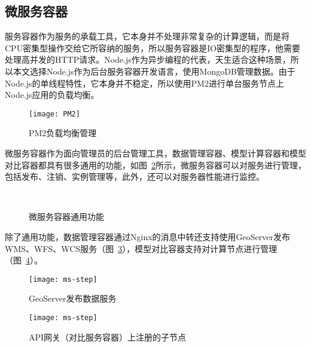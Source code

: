 \subsection{微服务容器}
服务容器作为服务的承载工具，它本身并不处理非常复杂的计算逻辑，而是将CPU密集型操作交给它所容纳的服务，所以服务容器是IO密集型的程序，他需要处理高并发的HTTP请求。Node.js作为异步编程的代表，天生适合这种场景，所以本文选择Node.js作为后台服务容器开发语言，使用MongoDB管理数据。由于Node.js的单线程特性，它本身并不稳定，所以使用PM2进行单台服务节点上Node.js应用的负载均衡。

\begin{figure}[!htbp]
    \centering
    \texttt{[image: PM2]}
    \caption{PM2负载均衡管理}
    \label{fig:ms-step}
\end{figure}

微服务容器作为面向管理员的后台管理工具，数据管理容器、模型计算容器和模型对比容器都具有很多通用的功能，如图~\ref{fig:service-container-common-fn}所示，微服务容器可以对服务进行管理，包括发布、注销、实例管理等，此外，还可以对服务器性能进行监控。

\begin{figure}[!htbp]
    \centering
    \hfill
     \\
    \hfill
    \caption{微服务容器通用功能}
    \label{fig:service-container-common-fn}
\end{figure}

除了通用功能，数据管理容器通过Nginx的消息中转还支持使用GeoServer发布WMS、WFS、WCS服务（图~\ref{fig:geoserver}），模型对比容器支持对计算节点进行管理（图~\ref{fig:api-gateway-children}）。

\begin{figure}[!htbp]
    \centering
    \texttt{[image: ms-step]}
    \caption{GeoServer发布数据服务}
    \label{fig:geoserver}
\end{figure}

\begin{figure}[!htbp]
    \centering
    \texttt{[image: ms-step]}
    \caption{API网关（对比服务容器）上注册的子节点}
    \label{fig:api-gateway-children}
\end{figure}

